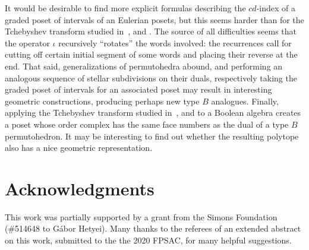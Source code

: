 \documentclass[reqno,12pt]{amsart}
\numberwithin{equation}{section}
\newcommand{\0}{\widehat{0}}
\newcommand{\1}{\widehat{1}}
\newcommand{\2}{\widehat{2}}
\newcommand{\iab}{\iota}
\begin{document}
It would be desirable to find more explicit formulas describing the
$cd$-index of a graded poset of intervals of an Eulerian posets, but
this seems harder than for the Tchebyshev transform studied 
in~\cite{Hetyei-tch}, \cite{Hetyei-mfp} and \cite{Ehrenborg-Readdy-Tch}. The
source of all difficulties seems that the operator $\iab$ recursively
``rotates'' the words involved: the recurrences call for cutting off certain
initial segment of some words and placing their reverse at the end. That
said, generalizations of permutohedra abound, and performing an
analogous sequence of stellar subdivisions on their duals, respectively
taking the graded poset of intervals for an associated poset may result
in interesting geometric constructions, producing perhaps new type $B$
analogues.  Finally, applying the Tchebyshev transform studied
in~\cite{Hetyei-tch}, \cite{Hetyei-mfp} and \cite{Ehrenborg-Readdy-Tch} to
a Boolean algebra creates a poset whose order complex has the same
face numbers as the dual of a type $B$ permutohedron. It may be
interesting to find out whether the resulting polytope also has a nice
geometric representation. 


\section*{Acknowledgments}
This work was partially supported by a grant from the Simons Foundation
(\#514648 to G\'abor Hetyei). Many thanks to the referees of an extended
abstract on this work, submitted to the the 2020 FPSAC, for many helpful
suggestions.  
\end{document}
